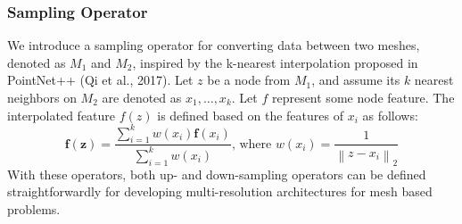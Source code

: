 \subsubsection{Sampling Operator}
We introduce a sampling operator for converting data between two meshes, denoted as \(M_1\) and \(M_2\), inspired by the k-nearest interpolation proposed in PointNet++ (Qi et al., 2017). Let \(z\) be a node from \(M_1\), and assume its \(k\) nearest neighbors on \(M_2\) are denoted as \(x_1, \ldots, x_k\). Let \(f\) represent some node feature. The interpolated feature \(f(z)\) is defined based on the features of \(x_i\) as follows:
\begin{equation}
  \mathbf{f}(\mathbf{z})=\frac{\sum_{i=1}^k w\left(x_i\right) \mathbf{f}\left(x_i\right)}{\sum_{i=1}^k w\left(x_i\right)} \text {, where } w\left(x_i\right)=\frac{1}{\left\|z-x_i\right\|_2}
  \end{equation}
With these operators, both up- and down-sampling operators can be defined straightforwardly for developing multi-resolution architectures for mesh based problems.
